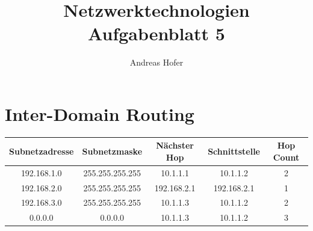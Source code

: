 \documentclass{article}
\title{\vspace{-1cm}Netzwerktechnologien Aufgabenblatt 5}
\author{Andreas Hofer}
\begin{document}
	\maketitle
	\section{Inter-Domain Routing}
	\begin{center}
		\begin{tabular}{| c | c | c | c | c |}
			\toprule
			Subnetzadresse & Subnetzmaske & Nächster Hop & Schnittstelle & Hop Count \\ \midrule
			192.168.1.0 & 255.255.255.255 & 10.1.1.1 & 10.1.1.2 & 2 \\
			192.168.2.0 & 255.255.255.255 & 192.168.2.1 & 192.168.2.1 & 1 \\
			192.168.3.0 & 255.255.255.255 & 10.1.1.3 & 10.1.1.2 & 2 \\
			0.0.0.0 & 0.0.0.0 & 10.1.1.3 & 10.1.1.2 & 3 \\
			\bottomrule
		\end{tabular}
	\end{center}
\end{document}
